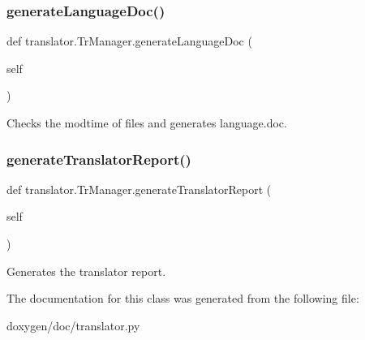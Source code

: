 \subsubsection{\texorpdfstring{generateLanguageDoc()}{generateLanguageDoc()}}
{\footnotesize\ttfamily def translator.\+Tr\+Manager.\+generate\+Language\+Doc (\begin{DoxyParamCaption}\item[{}]{self }\end{DoxyParamCaption})}

\begin{DoxyVerb}Checks the modtime of files and generates language.doc.\end{DoxyVerb}
 \mbox{\label{classtranslator_1_1_tr_manager_a84aba0e70020862ec40a29909de43687}} 
\subsubsection{\texorpdfstring{generateTranslatorReport()}{generateTranslatorReport()}}
{\footnotesize\ttfamily def translator.\+Tr\+Manager.\+generate\+Translator\+Report (\begin{DoxyParamCaption}\item[{}]{self }\end{DoxyParamCaption})}

\begin{DoxyVerb}Generates the translator report.\end{DoxyVerb}
 

The documentation for this class was generated from the following file\+:\begin{DoxyCompactItemize}
\item 
doxygen/doc/translator.\+py\end{DoxyCompactItemize}
